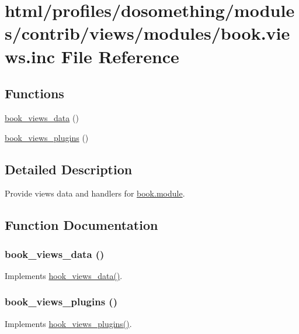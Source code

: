 \hypertarget{book_8views_8inc}{
\section{html/profiles/dosomething/modules/contrib/views/modules/book.views.inc File Reference}
\label{book_8views_8inc}
}
\subsection*{Functions}
\begin{DoxyCompactItemize}
\item 
\hyperlink{book_8views_8inc_af22995b80b019a7b00c8455590690c6f}{book\_\-views\_\-data} ()
\item 
\hyperlink{book_8views_8inc_adbe9780348b1d92897977066411e6d59}{book\_\-views\_\-plugins} ()
\end{DoxyCompactItemize}


\subsection{Detailed Description}
Provide views data and handlers for \hyperlink{book_8module}{book.module}. 

\subsection{Function Documentation}
\hypertarget{book_8views_8inc_af22995b80b019a7b00c8455590690c6f}{
\subsubsection[{book\_\-views\_\-data}]{\setlength{\rightskip}{0pt plus 5cm}book\_\-views\_\-data ()}}
\label{book_8views_8inc_af22995b80b019a7b00c8455590690c6f}
Implements \hyperlink{group__views__hooks_ga227057901681e4a33e33c199c7a8c989}{hook\_\-views\_\-data()}. \hypertarget{book_8views_8inc_adbe9780348b1d92897977066411e6d59}{
\subsubsection[{book\_\-views\_\-plugins}]{\setlength{\rightskip}{0pt plus 5cm}book\_\-views\_\-plugins ()}}
\label{book_8views_8inc_adbe9780348b1d92897977066411e6d59}
Implements \hyperlink{group__views__hooks_ga23f6e9972b2ed84fc54b7ff63f44477d}{hook\_\-views\_\-plugins()}. 
